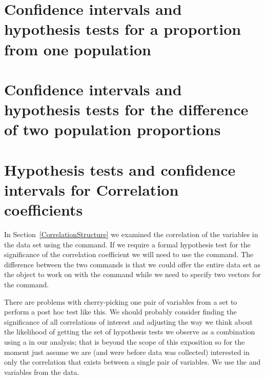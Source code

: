  
\section{Confidence intervals and hypothesis tests for a proportion from one population} 
 
\section{Confidence intervals and hypothesis tests for the difference of two population proportions} 
 
\section{Hypothesis tests and confidence intervals for Correlation coefficients} 
 
In Section~\ref{CorrelationStructure} 
we examined the correlation of the variables in the  data set using the  command.  
If we require a formal hypothesis test for the significance of the correlation coefficient we will need to use the  command. The difference between the two commands is that we could offer the entire data set as the object to work on with the  command while we need to specify two vectors for the  command. 
 
There are problems with cherry-picking one pair of variables from a set to perform a post hoc test like this. We should probably consider finding the significance of all correlations of interest and adjusting the way we think about the likelihood of getting the set of hypothesis tests we observe as a combination using a  in our analysis; that is beyond the scope of this exposition so for the moment just assume we are (and were before data was collected) interested in only the correlation that exists between a single pair of variables. We use the  and  variables from the  data. 
 
